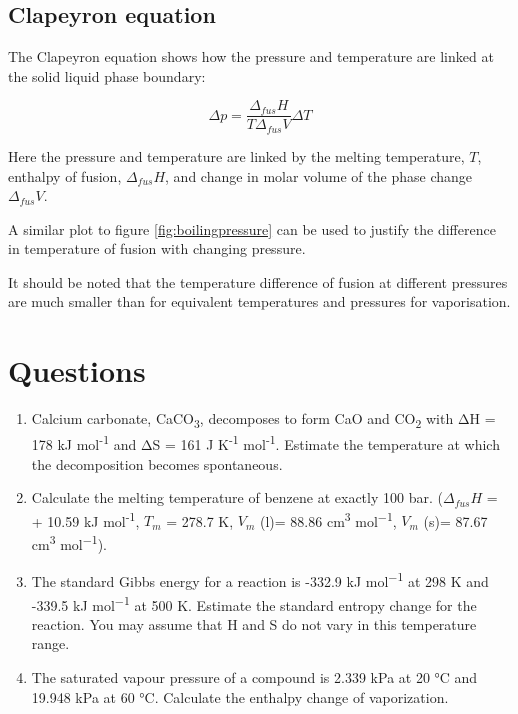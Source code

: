 \documentclass[
]{book}
\begin{document}
\hypertarget{clapeyron-equation}{%
\subsection{Clapeyron equation}\label{clapeyron-equation}}

The Clapeyron equation shows how the pressure and temperature are linked at the solid liquid phase boundary:

\begin{equation}
\Delta p=\frac{\Delta_{fus} H}{T \Delta _{fus}V}\Delta T
\label{eq:clapeyron}
\end{equation}

Here the pressure and temperature are linked by the melting temperature, \(T\), enthalpy of fusion, \(\Delta _{fus}H\), and change in molar volume of the phase change \(\Delta _{fus} V\).

A similar plot to figure \ref{fig:boilingpressure} can be used to justify the difference in temperature of fusion with changing pressure.

It should be noted that the temperature difference of fusion at different pressures are much smaller than for equivalent temperatures and pressures for vaporisation.

\hypertarget{sec:w4p1question}{%
\section{Questions}\label{sec:w4p1question}}

\begin{enumerate}
\def\labelenumi{\arabic{enumi}.}
\item
  Calcium carbonate, CaCO\textsubscript{3}, decomposes to form CaO and CO\textsubscript{2} with ΔH = 178 kJ mol\textsuperscript{-1} and ΔS = 161 J K\textsuperscript{-1} mol\textsuperscript{-1}. Estimate the temperature at which the decomposition becomes spontaneous.
\item
  Calculate the melting temperature of benzene at exactly 100 bar. (\(\Delta _{fus} H\) = + 10.59 kJ mol\textsuperscript{-1}, \(T_m\) = 278.7 K, \(V_m\) (l)= 88.86 cm\textsuperscript{3} mol\textsuperscript{−1}, \(V_m\) (s)= 87.67 cm\textsuperscript{3} mol\textsuperscript{−1}).
\item
  The standard Gibbs energy for a reaction is -332.9 kJ mol\textsuperscript{−1} at 298 K and -339.5 kJ mol\textsuperscript{−1} at 500 K. Estimate the standard entropy change for the reaction. You may assume that H and S do not vary in this temperature range.
\item
  The saturated vapour pressure of a compound is 2.339 kPa at 20 °C and 19.948 kPa at 60 °C. Calculate the enthalpy change of vaporization.
\end{enumerate}
\end{document}
